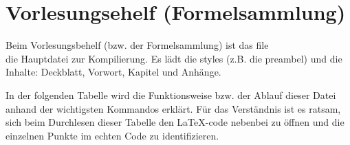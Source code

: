 \section{Vorlesungsehelf (Formelsammlung)}

Beim Vorlesungsbehelf (bzw. der \glqq{}Formelsammlung\grqq{}) ist das file
\\ die Hauptdatei zur Kompilierung.
Es lädt die styles (z.B. die preambel) und die Inhalte: Deckblatt, Vorwort,
Kapitel und Anhänge.

In der folgenden Tabelle wird die Funktionsweise bzw. der Ablauf dieser
Datei anhand der wichtigsten Kommandos erklärt. Für das Verständnis ist es
ratsam, sich beim Durchlesen dieser Tabelle den \LaTeX-code nebenbei zu öffnen
und die einzelnen Punkte im echten Code zu identifizieren.

\newpage
\begin{center}
\large{}
\end{center}

